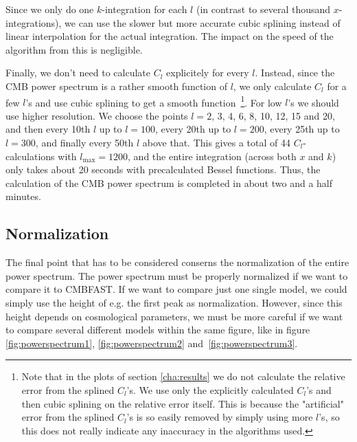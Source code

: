\documentclass[twocolumn,nofootinbib,amsmath,amssymb]{revtex4}
\begin{document}
Since we only do one $k$-integration for each $l$ (in contrast to several
thousand $x$-integrations), we can use the slower but more accurate cubic
splining instead of linear interpolation for the actual integration. The impact
on the speed of the algorithm from this is negligible.

Finally, we don't need to calculate $C_l$ explicitely for every $l$. Instead,
since the CMB power spectrum is a rather smooth function of $l$, we only
calculate $C_l$ for a few $l$'s and use cubic splining to get a smooth
function~\footnote{Note that in the plots of section \ref{cha:results} we do
not calculate the relative error from the splined $C_l$'s. We use only the
explicitly calculated $C_l$'s and then cubic splining on the relative error
itself. This is because the "artificial" error from the splined $C_l$'s is so
easily removed by simply using more $l$'s, so this does not really indicate any
inaccuracy in the algorithms used.}. For low $l$'s we should use higher
resolution. We choose the points $l = 2$, 3, 4, 6, 8, 10, 12, 15 and 20, and
then every 10th $l$ up to $l = 100$, every 20th up to $l = 200$, every 25th up
to $l = 300$, and finally every 50th $l$ above that. This gives a total of 44
$C_l$-calculations with $l_{\max} = 1200$, and the entire integration (across
both $x$ and $k$) only takes about 20 seconds with precalculated Bessel
functions. Thus, the calculation of the CMB power spectrum is completed in
about two and a half minutes.


\subsection{Normalization}
\label{cha:normalization}

The final point that has to be considered conserns the normalization of the
entire power spectrum. The power spectrum must be properly normalized if we
want to compare it to CMBFAST. If we want to compare just one single model, we
could simply use the height of e.g. the first peak as normalization. However,
since this height depends on cosmological parameters, we must be more careful
if we want to compare several different models within the same figure, like in
figure \ref{fig:powerspectrum1}, \ref{fig:powerspectrum2}
and~\ref{fig:powerspectrum3}.
\end{document}
